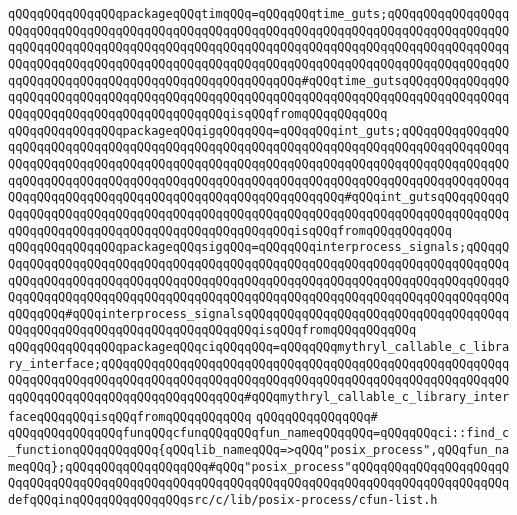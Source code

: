 \verb|qQQqqQQqqQQqqQQqpackageqQQqtimqQQq=qQQqqQQqtime_guts;qQQqqQQqqQQqqQQqqQQqqQQqqQQqqQQqqQQqqQQqqQQqqQQqqQQqqQQqqQQqqQQqqQQqqQQqqQQqqQQqqQQqqQQqqQQqqQQqqQQqqQQqqQQqqQQqqQQqqQQqqQQqqQQqqQQqqQQqqQQqqQQqqQQqqQQqqQQqqQQqqQQqqQQqqQQqqQQqqQQqqQQqqQQqqQQqqQQqqQQqqQQqqQQqqQQqqQQqqQQqqQQqqQQqqQQqqQQqqQQqqQQqqQQqqQQqqQQqqQQqqQQqqQQq#qQQqtime_gutsqQQqqQQqqQQqqQQqqQQqqQQqqQQqqQQqqQQqqQQqqQQqqQQqqQQqqQQqqQQqqQQqqQQqqQQqqQQqqQQqqQQqqQQqqQQqqQQqqQQqqQQqqQQqqQQqqQQqisqQQqfromqQQqqQQqqQQq|\newline
\verb|qQQqqQQqqQQqqQQqpackageqQQqigqQQqqQQq=qQQqqQQqint_guts;qQQqqQQqqQQqqQQqqQQqqQQqqQQqqQQqqQQqqQQqqQQqqQQqqQQqqQQqqQQqqQQqqQQqqQQqqQQqqQQqqQQqqQQqqQQqqQQqqQQqqQQqqQQqqQQqqQQqqQQqqQQqqQQqqQQqqQQqqQQqqQQqqQQqqQQqqQQqqQQqqQQqqQQqqQQqqQQqqQQqqQQqqQQqqQQqqQQqqQQqqQQqqQQqqQQqqQQqqQQqqQQqqQQqqQQqqQQqqQQqqQQqqQQqqQQqqQQqqQQqqQQqqQQqqQQq#qQQqint_gutsqQQqqQQqqQQqqQQqqQQqqQQqqQQqqQQqqQQqqQQqqQQqqQQqqQQqqQQqqQQqqQQqqQQqqQQqqQQqqQQqqQQqqQQqqQQqqQQqqQQqqQQqqQQqqQQqqQQqqQQqisqQQqfromqQQqqQQqqQQq|\newline
\verb|qQQqqQQqqQQqqQQqpackageqQQqsigqQQq=qQQqqQQqinterprocess_signals;qQQqqQQqqQQqqQQqqQQqqQQqqQQqqQQqqQQqqQQqqQQqqQQqqQQqqQQqqQQqqQQqqQQqqQQqqQQqqQQqqQQqqQQqqQQqqQQqqQQqqQQqqQQqqQQqqQQqqQQqqQQqqQQqqQQqqQQqqQQqqQQqqQQqqQQqqQQqqQQqqQQqqQQqqQQqqQQqqQQqqQQqqQQqqQQqqQQqqQQqqQQqqQQqqQQqqQQqqQQqqQQq#qQQqinterprocess_signalsqQQqqQQqqQQqqQQqqQQqqQQqqQQqqQQqqQQqqQQqqQQqqQQqqQQqqQQqqQQqqQQqqQQqqQQqisqQQqfromqQQqqQQqqQQq|\newline
\verb|qQQqqQQqqQQqqQQqpackageqQQqciqQQqqQQq=qQQqqQQqmythryl_callable_c_library_interface;qQQqqQQqqQQqqQQqqQQqqQQqqQQqqQQqqQQqqQQqqQQqqQQqqQQqqQQqqQQqqQQqqQQqqQQqqQQqqQQqqQQqqQQqqQQqqQQqqQQqqQQqqQQqqQQqqQQqqQQqqQQqqQQqqQQqqQQqqQQqqQQqqQQqqQQqqQQqqQQq#qQQqmythryl_callable_c_library_interfaceqQQqqQQqisqQQqfromqQQqqQQqqQQq|\newline
\verb|qQQqqQQqqQQqqQQq#|\newline
\verb|qQQqqQQqqQQqqQQqfunqQQqcfunqQQqqQQqfun_nameqQQqqQQq=qQQqqQQqci::find_c_functionqQQqqQQqqQQq{qQQqlib_nameqQQq=>qQQq"posix_process",qQQqfun_nameqQQq};qQQqqQQqqQQqqQQqqQQq#qQQq"posix_process"qQQqqQQqqQQqqQQqqQQqqQQqqQQqqQQqqQQqqQQqqQQqqQQqqQQqqQQqqQQqqQQqqQQqqQQqqQQqqQQqqQQqqQQqqQQqdefqQQqinqQQqqQQqqQQqqQQqsrc/c/lib/posix-process/cfun-list.h|\newline
